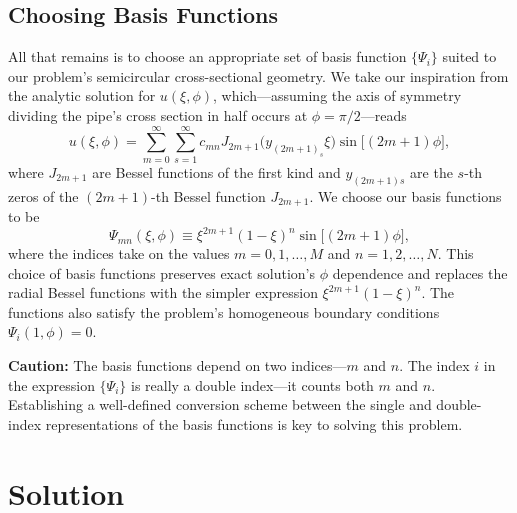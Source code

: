 \documentclass[11pt, a4paper]{article}
\begin{document}
\subsection{Choosing Basis Functions}
All that remains is to choose an appropriate set of basis function $ \{\Psi_{i}\} $ suited to our problem's semicircular cross-sectional geometry. We take our inspiration from the analytic solution for $ u(\xi, \phi) $, which---assuming the axis of symmetry dividing the pipe's cross section in half occurs at $ \phi = \pi/2 $---reads
\begin{equation*}
	u(\xi, \phi) = \sum_{m=0}^{\infty}\sum_{s=1}^{\infty}c_{mn}J_{2m+1}\big(y_{(2m+1)_{s}}\xi\big)\sin \big[(2m+1)\phi\big],
\end{equation*}
where $ J_{2m+1} $ are Bessel functions of the first kind and $ y_{(2m+1)s} $ are the $ s $-th zeros of the $ (2m+1) $-th Bessel function $ J_{2m+1} $. We choose our basis functions to be
\begin{equation}
	\Psi_{mn}(\xi, \phi) \equiv \xi^{2m+1}(1-\xi)^{n} \sin\big[(2m+1)\phi\big], \label{gal:eq:basis1}
\end{equation}
where the indices take on the values $ m = 0, 1, \ldots, M $ and $ n = 1, 2, \ldots, N$. This choice of basis functions preserves exact solution's $ \phi $ dependence and replaces the radial Bessel functions with the simpler expression  $ \xi^{2m+1}(1-\xi)^{n} $. The functions also satisfy the problem's homogeneous boundary conditions $ \Psi_{i}(1, \phi) = 0 $.

\vspace{2mm}
\textbf{Caution:} The basis functions depend on two indices---$ m $ and $ n $. The index $ i $ in the expression $ \{\Psi_{i}\} $ is really a double index---it counts both $ m $ and $ n $. Establishing a well-defined conversion scheme between the single and double-index representations of the basis functions is key to solving this problem.


\section{Solution}  \label{gal:s:solution}
\end{document}
